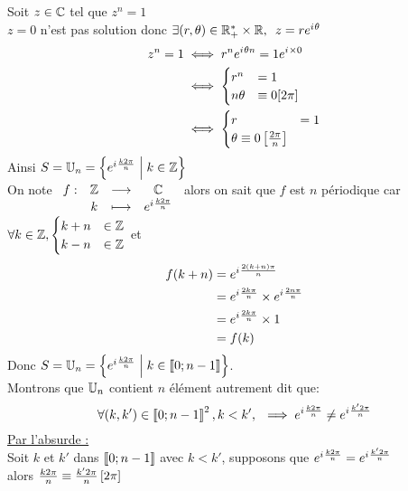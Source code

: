 \begin{dem}
    Soit \(z \in\mathbb{C}\) tel que \(z^n = 1\) \\
    \(z=0\) n'est pas solution donc \(\quantifs{\exists (r,\theta) \in \Rps\times\R}z = re^{\i \theta}\) 
    \begin{align*}
        z^n=1 &\iff r^ne^{i\mkern1mu \theta n }= 1e^{i\mkern1mu \times 0} \\
        &\iff  
            \begin{cases}
                r^n &= 1 \\
                n \theta &\equiv 0 [2\pi]
            \end{cases}\\
        &\iff \begin{cases}
                r &= 1 \\
                \theta \equiv 0 \left[\frac{2\pi}{n}\right]
            \end{cases}\\
    \end{align*}
    Ainsi \(S = \mathbb{U}_n =\left\lbrace e^{i\mkern1mu \frac{k2\pi}{n}}\;\middle|\; k \in \mathbb{Z}\right\rbrace\) \\
    On note \(\begin{array}[t]{cccc}f : & \mathbb{Z} & \longrightarrow & \mathbb{C} \\ & k & \longmapsto & e^{i\mkern1mu \frac{k2\pi}{n}}\end{array}\) alors on sait que \(f\) est \(n\) périodique car \(\forall  k \in \mathbb{Z}, \begin{cases}
        k+n &\in \mathbb{Z} \\
        k-n &\in \mathbb{Z}
    \end{cases} \)
    et 
    \begin{align*}
        f(k+n) &= e^{i\mkern1mu \frac{2(k+n)\pi}{n}} \\
               &= e^{i\mkern1mu \frac{2k\pi}{n}}\times e^{i\mkern1mu \frac{2n\pi}{n}} \\
               &= e^{i\mkern1mu \frac{2k\pi}{n}}\times 1 \\
               &= f(k)
    \end{align*}
    Donc \(S = \mathbb{U}_n =\left\lbrace e^{i\mkern1mu \frac{k2\pi}{n}}\;\middle|\; k \in \left\llbracket0;n-1\right\rrbracket\right\rbrace\). \\
    Montrons que \(\mathbb{U}_n\) contient \(n\) élément autrement dit que: 
    \[\quantifs{\forall (k,k') \in\interventierii{0}{n-1}^2,k<k'} \imp e^{\i \frac{k2\pi}{n}} \neq e^{\i \frac{k'2\pi}{n}}\]
    \underline{Par l'absurde :}\\
    Soit \(k\) et \(k'\) dans \(\left\llbracket0;n-1\right\rrbracket\) avec \(k<k'\), supposons que \(e^{i\mkern1mu \frac{k2\pi}{n}} = e^{i\mkern1mu \frac{k'2\pi}{n}}\) \\
    alors \(\frac{k2\pi}{n} \equiv \frac{k'2\pi}{n} \left[2\pi\right]\)\\

\end{dem}
